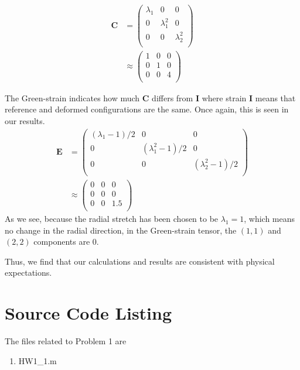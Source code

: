 \documentclass[../main.tex]{subfiles}
\begin{document}
        \begin{align*}
          \mathbf{C} &=
                       \begin{pmatrix}
                         \lambda_1 & 0 & 0\\
                         0 & \lambda_1^2 & 0\\
                         0 & 0 & \lambda_2^2\\
                       \end{pmatrix}\\ &\approx
                                         \begin{pmatrix}
                                             1 & 0 & 0\\
                                             0 & 1 & 0\\
                                             0 & 0 & 4\\
                                           \end{pmatrix}
        \end{align*}
        
        The Green-strain indicates how much $\mathbf{C}$ differs from $\mathbf{I}$ where strain $\mathbf{I}$ means 
        that reference and deformed configurations are the same. Once again, this is seen in our results.
        \begin{align*}
          \mathbf{E} &=
                       \begin{pmatrix}
                         (\lambda_1-1)/2 & 0 & 0\\
                         0 & (\lambda_1^2-1)/2 & 0\\
                         0 & 0 & (\lambda_2^2-1)/2\\
                       \end{pmatrix}\\ &\approx
                                         \begin{pmatrix}
                                           0 & 0 & 0\\
                                           0 & 0 & 0\\
                                           0 & 0 & 1.5\\
                                         \end{pmatrix}
        \end{align*}
        As we see, because the radial stretch has been chosen to be $\lambda_1=1$, which means no change in
        the radial direction, in the Green-strain tensor, the $(1,1)$ and $(2,2)$ components are $0$.
        
        Thus, we find that our calculations and results are consistent with physical expectations.
        \section{Source Code Listing}
        The files related to Problem 1 are
        \begin{enumerate}
        \item HW1\_1.m
        \end{enumerate}
      
\end{document}
